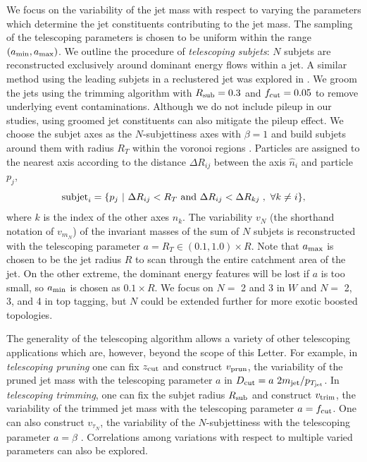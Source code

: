 \documentclass[aps,prl,floatfix,preprintnumbers,twocolumn,groupedaddress,nofootinbib]{revtex4-1}
\begin{document}
We focus on the variability of the jet mass with respect to varying the parameters which determine the jet constituents contributing to the jet mass. The sampling of the telescoping parameters is chosen to be uniform within the range $(a_{\rm min},a_{\rm max})$. We outline the procedure of \textit{telescoping subjets}: $N$ subjets are reconstructed exclusively around dominant energy flows within a jet. A similar method using the leading subjets in a reclustered jet was explored in \cite{Cui:2010km}. We groom the jets using the trimming algorithm with $R_{\rm sub}=0.3$ and $f_{\rm cut}=0.05$ to remove underlying event contaminations. Although we do not include pileup in our studies, using groomed jet constituents can also mitigate the pileup effect. We choose the subjet axes as the $N$-subjettiness axes \cite{Thaler:2011gf} with $\beta = 1$ and build subjets around them with radius $R_T$ within the voronoi regions \cite{Stewart:2010tn,Chien:2013kca,Stewart:2015waa,Thaler:2015xaa}. Particles are assigned to the nearest axis according to the distance $\Delta R_{ij}$ between the axis $\hat n_i$ and particle $p_j$,
\begin{equation}
    {\rm subjet}_{i} = \{p_j~|~\Delta R_{ij}<R_T~{\rm and}~\Delta R_{ij}<\Delta R_{kj}\;,~\forall k\neq i\},
\end{equation}
where $k$ is the index of the other axes $\hat n_k$. The variability $v_{N}$ (the shorthand notation of $v_{m_N}$) of the invariant masses of the sum of $N$ subjets is reconstructed with the telescoping parameter $a = R_{T}\in (0.1, 1.0)\times R$. Note that $a_{\rm max}$ is chosen to be the jet radius $R$ to scan through the entire catchment area of the jet. On the other extreme, the dominant energy features will be lost if $a$ is too small, so $a_{\rm min}$ is chosen as $0.1\times R$. We focus on $N = $ 2 and 3 in $W$ and $N = $ 2, 3, and 4 in top tagging, but $N$ could be extended further for more exotic boosted topologies.

The generality of the telescoping algorithm allows a variety of other telescoping applications which are, however, beyond the scope of this Letter. For example, in \textit{telescoping pruning} one can fix $z_{\rm cut}$ and construct $v_{\rm prun}$, the variability of the pruned jet mass with the telescoping parameter $a$ in $D_{\rm cut} = a~ 2m_{\rm jet}/p_{T_{\rm jet}}$. In
\textit{telescoping trimming}, one can fix the subjet radius $R_{\rm sub}$ and construct $v_{\rm trim}$, the variability of the trimmed jet mass with the telescoping parameter $a = f_{\rm cut}$. One can also construct $v_{\tau_N}$, the variability of the $N$-subjettiness with the telescoping parameter $a = \beta$ \cite{Thaler:2010tr}. Correlations among variations with respect to multiple varied parameters can also be explored.
\end{document}
